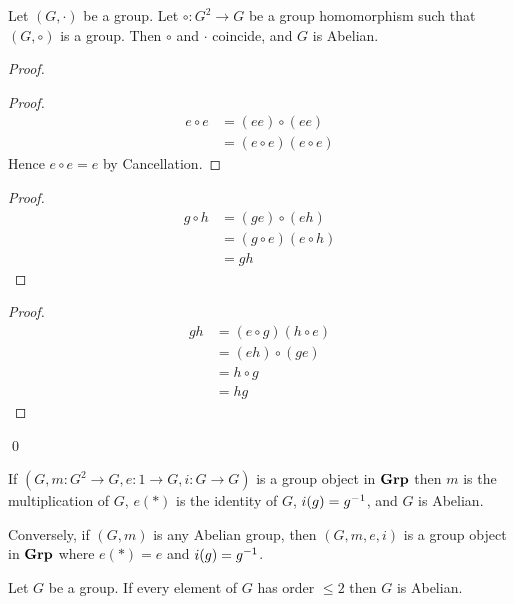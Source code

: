 \begin{prop}
Let $(G,\cdot)$ be a group. Let $\circ : G^2 \rightarrow G$ be a group homomorphism such that $(G,\circ)$ is a group. Then $\circ$ and $\cdot$ coincide, and $G$ is Abelian.
\end{prop}

\begin{proof}
\pf
{}
\begin{proof}
\pf
\begin{align*}
e \circ e & = (ee) \circ (ee) \\
& = (e \circ e) (e \circ e)
\end{align*}
Hence $e \circ e = e$ by Cancellation.
\end{proof}
\begin{proof}
\pf
\begin{align*}
g \circ h & = (ge) \circ (eh) \\
& = (g \circ e)(e \circ h) \\
& = gh
\end{align*}
\end{proof}
\begin{proof}
\pf
\begin{align*}
gh & = (e \circ g)(h \circ e) \\
& = (eh) \circ (ge) \\
& = h \circ g \\
& = hg
\end{align*}
\end{proof}
\qed
\end{proof}

\begin{cor}
\label{cor:group-in-group}
If $(G, m : G^2 \rightarrow G, e : 1 \rightarrow G, i : G \rightarrow G)$ is a group object in $\mathbf{Grp}$ then $m$ is the multiplication of $G$, $e(*)$ is the identity of $G$, $i(g) = {g}^{-1}$, and $G$ is Abelian.

Conversely, if $(G, m)$ is any Abelian group, then $(G,m,e,i)$ is a group object in $\mathbf{Grp}$ where $e(*) = e$ and $i(g) = {g}^{-1}$.
\end{cor}

\begin{prop}
\label{prop:all-orders-leq-two}
Let $G$ be a group.
If every element of $G$ has order $\leq 2$ then $G$ is Abelian.
\end{prop}

